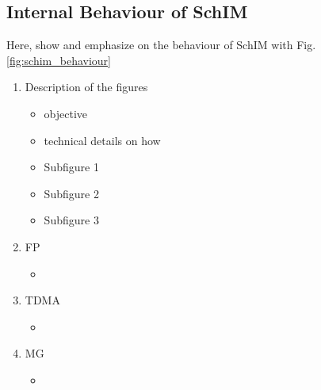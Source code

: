   \subsection{Internal Behaviour of SchIM}
    \label{subsec:internal-behaviour-of-schim}
    Here, show and emphasize on the behaviour of SchIM with Fig.\ref{fig:schim_behaviour}
    \begin{enumerate}
      \item Description of the figures
        \begin{itemize}
          \item objective
          \item technical details on how
          \item Subfigure 1
          \item Subfigure 2
          \item Subfigure 3
        \end{itemize}
      \item FP
        \begin{itemize}
          \item 
        \end{itemize}
      \item TDMA
        \begin{itemize}
          \item 
        \end{itemize}
      \item MG
        \begin{itemize}
          \item 
        \end{itemize}
    \end{enumerate}
